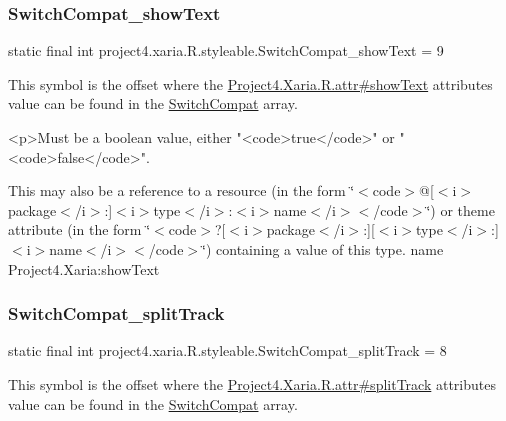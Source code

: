 \subsubsection{\texorpdfstring{Switch\+Compat\+\_\+show\+Text}{SwitchCompat\_showText}}
{\footnotesize\ttfamily static final int project4.\+xaria.\+R.\+styleable.\+Switch\+Compat\+\_\+show\+Text = 9\hspace{0.3cm}{\ttfamily [static]}}

This symbol is the offset where the \hyperlink{}{Project4.\+Xaria.\+R.\+attr\#show\+Text} attribute\textquotesingle{}s value can be found in the \hyperlink{classproject4_1_1xaria_1_1R_1_1styleable_a15d9950df3a97e57d9c57e4c4b7e8e87}{Switch\+Compat} array.

\begin{DoxyVerb}      <p>Must be a boolean value, either "<code>true</code>" or "<code>false</code>".
\end{DoxyVerb}
 

This may also be a reference to a resource (in the form \char`\"{}$<$code$>$@\mbox{[}$<$i$>$package$<$/i$>$\+:\mbox{]}$<$i$>$type$<$/i$>$\+:$<$i$>$name$<$/i$>$$<$/code$>$\char`\"{}) or theme attribute (in the form \char`\"{}$<$code$>$?\mbox{[}$<$i$>$package$<$/i$>$\+:\mbox{]}\mbox{[}$<$i$>$type$<$/i$>$\+:\mbox{]}$<$i$>$name$<$/i$>$$<$/code$>$\char`\"{}) containing a value of this type.  name Project4.\+Xaria\+:show\+Text \mbox{\label{classproject4_1_1xaria_1_1R_1_1styleable_a9e4d678c79e9aa05ed9604fba7663099}} 
\subsubsection{\texorpdfstring{Switch\+Compat\+\_\+split\+Track}{SwitchCompat\_splitTrack}}
{\footnotesize\ttfamily static final int project4.\+xaria.\+R.\+styleable.\+Switch\+Compat\+\_\+split\+Track = 8\hspace{0.3cm}{\ttfamily [static]}}

This symbol is the offset where the \hyperlink{}{Project4.\+Xaria.\+R.\+attr\#split\+Track} attribute\textquotesingle{}s value can be found in the \hyperlink{classproject4_1_1xaria_1_1R_1_1styleable_a15d9950df3a97e57d9c57e4c4b7e8e87}{Switch\+Compat} array.

